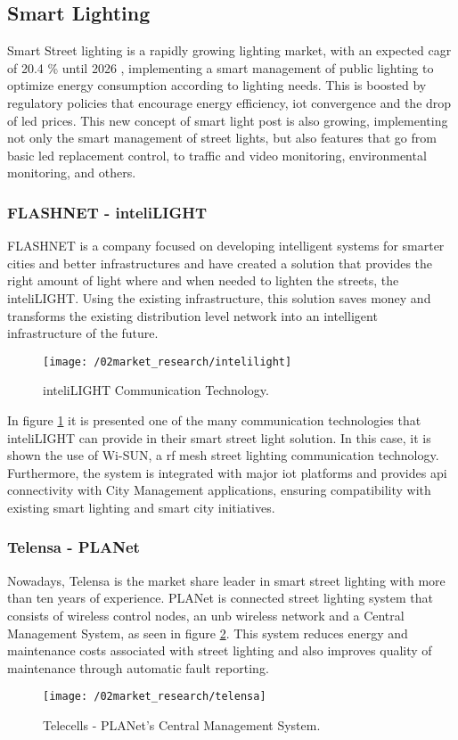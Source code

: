 \subsection{Smart Lighting}
Smart Street lighting is a rapidly growing lighting market, with an expected \ac{cagr} of 20.4 \% until 2026 \cite{smart_light_market}, implementing a smart management of public lighting to optimize energy consumption according to lighting needs. This is boosted by regulatory policies that encourage energy efficiency, \ac{iot} convergence and the drop of \ac{led} prices. This new concept of smart light post is also growing, implementing not only the smart management of street lights, but also features that go from basic \ac{led} replacement control, to traffic and video monitoring, environmental monitoring, and others. 

\subsubsection{FLASHNET - inteliLIGHT}
FLASHNET is a company focused on developing intelligent systems for smarter cities and better infrastructures and have created a solution that provides the right amount of light where and when needed to lighten the streets, the inteliLIGHT. \cite{inteli_light} Using the existing infrastructure, this solution saves money and transforms the existing distribution level network into an intelligent infrastructure of the future.

\clearpage
\begin{figure}[ht]
	\centering
	\texttt{[image: /02market\_research/intelilight]}
	\caption{inteliLIGHT Communication Technology.}
	\label{fig:intelilight}
\end{figure}

In figure \ref{fig:intelilight} it is presented one of the many communication technologies that inteliLIGHT can provide in their smart street light solution. In this case, it is shown the use of Wi-SUN, a \ac{rf} mesh street lighting communication technology.
Furthermore, the system is integrated with major \ac{iot} platforms and provides \ac{api} connectivity with City Management applications, ensuring compatibility with existing smart lighting and smart city initiatives.

\subsubsection{Telensa - PLANet}
Nowadays, Telensa is the market share leader in smart street lighting with more than ten years of experience.\cite{telensa_solutions} PLANet is connected street lighting system that consists of wireless control nodes, an \ac{unb} wireless network and a Central Management System, as seen in figure \ref{fig:telensa}. This system reduces energy and maintenance costs associated with street lighting and also improves quality of maintenance through automatic fault reporting.
\clearpage
\begin{figure}[ht]
	\centering
	\texttt{[image: /02market\_research/telensa]}
	\caption{Telecells - PLANet's Central Management System.}
	\label{fig:telensa}
\end{figure}

